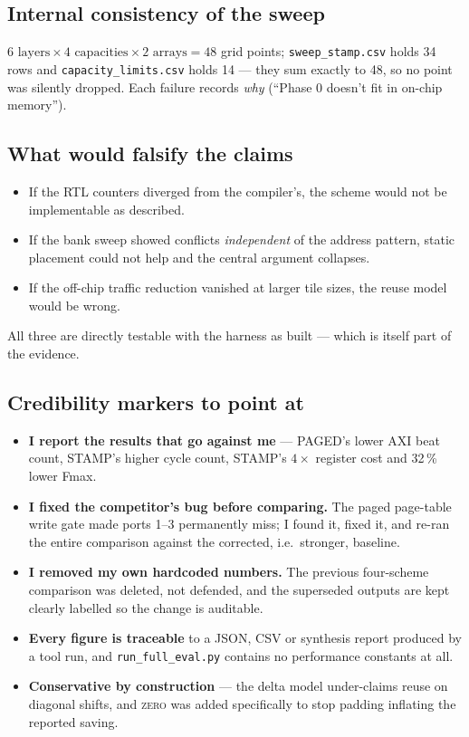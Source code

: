 \documentclass[11pt,a4paper]{article}
\newcommand{\op}[1]{\textsc{#1}}
\newcommand{\file}[1]{\texttt{\small #1}}
\begin{document}
\subsection{Internal consistency of the sweep}

$6 \text{ layers} \times 4 \text{ capacities} \times 2 \text{ arrays} = 48$
grid points; \file{sweep\_stamp.csv} holds 34 rows and
\file{capacity\_limits.csv} holds 14 --- they sum exactly to 48, so no point was
silently dropped. Each failure records \emph{why} (``Phase 0 doesn't fit in
on-chip memory'').

\subsection{What would falsify the claims}

\begin{itemize}[leftmargin=1.5em,itemsep=3pt]
  \item If the RTL counters diverged from the compiler's, the scheme would not
        be implementable as described.
  \item If the bank sweep showed conflicts \emph{independent} of the address
        pattern, static placement could not help and the central argument
        collapses.
  \item If the off-chip traffic reduction vanished at larger tile sizes, the
        reuse model would be wrong.
\end{itemize}
All three are directly testable with the harness as built --- which is itself
part of the evidence.

\subsection{Credibility markers to point at}

\begin{itemize}[leftmargin=1.5em,itemsep=3pt]
  \item \textbf{I report the results that go against me} --- PAGED's lower AXI
        beat count, STAMP's higher cycle count, STAMP's $4\times$ register cost
        and 32\,\% lower Fmax.
  \item \textbf{I fixed the competitor's bug before comparing.} The paged
        page-table write gate made ports 1--3 permanently miss; I found it,
        fixed it, and re-ran the entire comparison against the corrected, i.e.\
        stronger, baseline.
  \item \textbf{I removed my own hardcoded numbers.} The previous four-scheme
        comparison was deleted, not defended, and the superseded outputs are
        kept clearly labelled so the change is auditable.
  \item \textbf{Every figure is traceable} to a JSON, CSV or synthesis report
        produced by a tool run, and \file{run\_full\_eval.py} contains no
        performance constants at all.
  \item \textbf{Conservative by construction} --- the delta model under-claims
        reuse on diagonal shifts, and \op{zero} was added specifically to stop
        padding inflating the reported saving.
\end{itemize}
\end{document}
